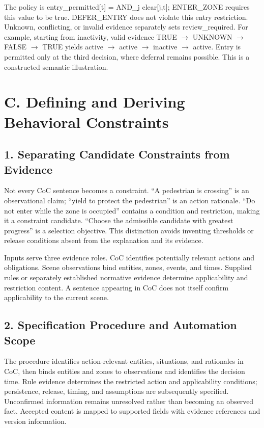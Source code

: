 \documentclass[11pt,a4paper]{article}
\begin{document}
The policy is {\ttfamily\small entry\_permitted[t] = AND\_j clear[j,t]}; ENTER\_ZONE requires this value to be true. DEFER\_ENTRY does not violate this entry restriction. Unknown, conflicting, or invalid evidence separately sets {\ttfamily\small review\_required}. For example, starting from inactivity, valid evidence TRUE \ensuremath{\rightarrow} UNKNOWN \ensuremath{\rightarrow} FALSE \ensuremath{\rightarrow} TRUE yields active \ensuremath{\rightarrow} active \ensuremath{\rightarrow} inactive \ensuremath{\rightarrow} active. Entry is permitted only at the third decision, where deferral remains possible. This is a constructed semantic illustration.\par

\section*{C. Defining and Deriving Behavioral Constraints}

\subsection*{1. Separating Candidate Constraints from Evidence}

Not every CoC sentence becomes a constraint. “A pedestrian is crossing” is an observational claim; “yield to protect the pedestrian” is an action rationale. “Do not enter while the zone is occupied” contains a condition and restriction, making it a constraint candidate. “Choose the admissible candidate with greatest progress” is a selection objective. This distinction avoids inventing thresholds or release conditions absent from the explanation and its evidence.\par

Inputs serve three evidence roles. CoC identifies potentially relevant actions and obligations. Scene observations bind entities, zones, events, and times. Supplied rules or separately established normative evidence determine applicability and restriction content. A sentence appearing in CoC does not itself confirm applicability to the current scene.\par

\subsection*{2. Specification Procedure and Automation Scope}

The procedure identifies action-relevant entities, situations, and rationales in CoC, then binds entities and zones to observations and identifies the decision time. Rule evidence determines the restricted action and applicability conditions; persistence, release, timing, and assumptions are subsequently specified. Unconfirmed information remains unresolved rather than becoming an observed fact. Accepted content is mapped to supported fields with evidence references and version information.\par
\end{document}
